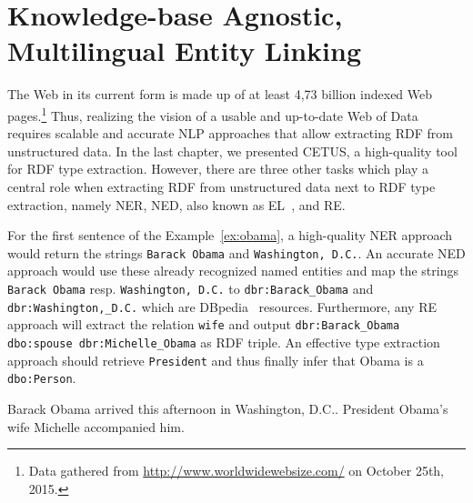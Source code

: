 
\chapter{Knowledge-base Agnostic, Multilingual Entity Linking}
\label{cha:agdistis}

The Web in its current form is made up of at least 4,73  billion indexed Web pages.\footnote{Data gathered from \url{http://www.worldwidewebsize.com/} on October 25th, 2015.}
Thus, realizing the vision of a usable and up-to-date Web of Data requires scalable and accurate \ac{NLP} approaches that allow extracting \ac{RDF} from  unstructured data.
In the last chapter, we presented CETUS, a high-quality tool for \ac{RDF} type extraction.  
However, there are three other tasks which play a central role when extracting \ac{RDF} from unstructured data next to \ac{RDF} type extraction, namely  \ac{NER}, \ac{NED}, also known as \ac{EL}~\cite{Mihalcea:2007:WLD:1321440.1321475}, and \ac{RE}.

For the first sentence of the Example~\ref{ex:obama}, a high-quality \ac{NER} approach would return the strings \texttt{Barack Obama} and \texttt{Washington, D.C.}.
An accurate \ac{NED} approach would use these already recognized named entities and map the strings \texttt{Barack Obama} resp. \texttt{Washington, D.C.} to \texttt{dbr:Barack\_Obama} and \texttt{dbr:Washington,\_D.C.} which are DBpedia~\cite{dbpedia-swj} resources. 
Furthermore, any \ac{RE} approach will extract the relation \texttt{wife} and output \texttt{dbr:Barack\_Obama dbo:spouse dbr:Michelle\_Obama} as RDF triple.
An effective type extraction approach should retrieve \texttt{President} and thus finally infer that Obama is a \texttt{dbo:Person}.
\begin{ex}
Barack Obama arrived this afternoon in Washington, D.C.. President Obama's wife Michelle accompanied him.
\label{ex:obama}
\end{ex}

